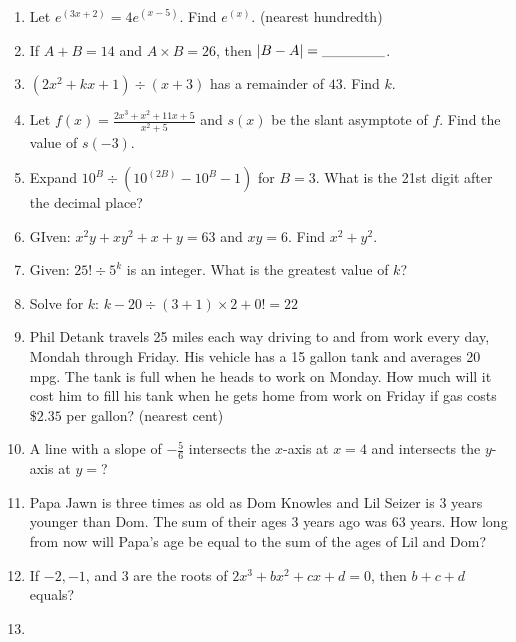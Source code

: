 \documentclass[../uilmath.tex]{subfiles}
\begin{document}
\begin{enumerate}[label=\bfseries\arabic*.]
        \item %
        Let $e^{(3x+2)}=4e^{(x-5)}$. Find $e^{(x)}$. (nearest hundredth)

        \item %
        If $A+B=14$ and $A\times B=26$, then $|B-A|=\_\_\_\_\_\_$.

        \item %
        $(2x^2+kx+1)\div (x+3)$ has a remainder of $43$. Find $k$.

        \item %
        Let $f(x)=\frac{2x^3+x^2+11x+5}{x^2+5}$ and $s(x)$ be the slant asymptote of $f$. Find the value of $s(-3)$.

        \item %
        Expand $10^B\div (10^{(2B)}-10^B-1)$ for $B=3$. What is the 21st digit after the decimal place?

        \item %
        GIven: $x^2y+xy^2+x+y=63$ and $xy=6$. Find $x^2+y^2$.

        \item %
        Given: $25!\div 5^k$ is an integer. What is the greatest value of $k$?

        \item %
        Solve for $k$: $k-20\div (3+1)\times 2+0!=22$

        \item %
        Phil Detank travels 25 miles each way driving to and from work every day, Mondah through Friday. His vehicle has a 15 gallon tank and averages 20 mpg. The tank is full when he heads to work on Monday.
        How much will it cost him to fill his tank when he gets home from work on Friday if gas costs $\$2.35$ per gallon? (nearest cent)
        
        \item %
        A line with a slope of $-\frac{5}{6}$ intersects the $x$-axis at $x=4$ and intersects the $y$-axis at $y=$?

        \item %
        Papa Jawn is three times as old as Dom Knowles and Lil Seizer is 3 years younger than Dom. The sum of their ages 3 years ago was 63 years. How long from now will Papa's age be equal to the sum of the ages of Lil and Dom?

        \item %
        If $-2,-1$, and $3$ are the roots of $2x^3+bx^2+cx+d=0$, then $b+c+d$ equals?

        \item %
        
\end{enumerate}
\end{document}
